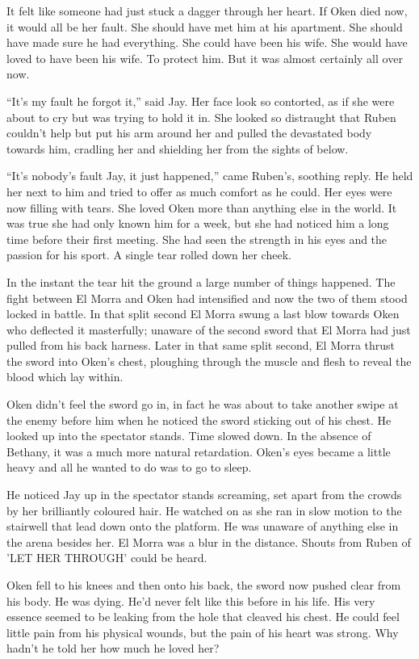 It felt like someone had just stuck a dagger through her heart.  If Oken died now, it would all be her fault.  She should have met him at his apartment.  She should have made sure he had everything.  She could have been his wife.  She would have loved to have been his wife.  To protect him.  But it was almost certainly all over now.

``It's my fault he forgot it,'' said Jay.  Her face look so contorted, as if she were about to cry but was trying to hold it in.  She looked so distraught that Ruben couldn't help but put his arm around her and pulled the devastated body towards him, cradling her and shielding her from the sights of below.

``It's nobody's fault Jay, it just happened,'' came Ruben's, soothing reply.  He held her next to him and tried to offer as much comfort as he could.  Her eyes were now filling with tears.  She loved Oken more than anything else in the world.  It was true she had only known him for a week, but she had noticed him a long time before their first meeting.  She had seen the strength in his eyes and the passion for his sport.  A single tear rolled down her cheek.

In the instant the tear hit the ground a large number of things happened.  The fight between El Morra and Oken had intensified and now the two of them stood locked in battle.  In that split second El Morra swung a last blow towards Oken who deflected it masterfully; unaware of the second sword that El Morra had just pulled from his back harness.  Later in that same split second, El Morra thrust the sword into Oken's chest, ploughing through the muscle and flesh to reveal the blood which lay within.

Oken didn't feel the sword go in, in fact he was about to take another swipe at the enemy before him when he noticed the sword sticking out of his chest.  He looked up into the spectator stands.  Time slowed down.  In the absence of Bethany, it was a much more natural retardation.  Oken's eyes became a little heavy and all he wanted to do was to go to sleep.  

He noticed Jay up in the spectator stands screaming, set apart from the crowds by her brilliantly coloured hair.  He watched on as she ran in slow motion to the stairwell that lead down onto the platform.  He was unaware of anything else in the arena besides her.  El Morra was a blur in the distance.  Shouts from Ruben of 'LET HER THROUGH' could be heard.  

Oken fell to his knees and then onto his back, the sword now pushed clear from his body.  He was dying.  He'd never felt like this before in his life.  His very essence seemed to be leaking from the hole that cleaved his chest.  He could feel little pain from his physical wounds, but the pain of his heart was strong.  Why hadn't he told her how much he loved her?  

